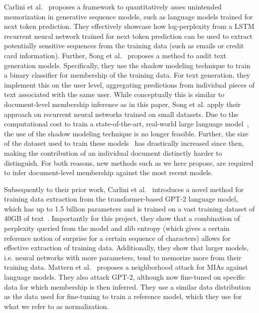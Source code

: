 \documentclass[twocolumn,10pt]{article}
\begin{document}
Carlini et al.~\cite{carlini2019secret} proposes a framework to quantitatively asses unintended memorization in generative sequence models, such as language models trained for next token prediction. They effectively showcase how log-perplexity from a LSTM recurrent neural network trained for next token prediction can be used to extract potentially sensitive sequences from the training data (such as emails or credit card information). 
Further, Song et al.~\cite{song2019auditing} proposes a method to audit text generation models. Specifically, they use the shadow modeling technique to train a binary classifier for membership of the training data. For text generation, they implement this on the user level, aggregating predictions from individual pieces of text associated with the same user. 
While conceptually this is similar to document-level membership inference as in this paper, Song et al. apply their approach on recurrent neural networks trained on small datasets. Due to the computational cost to train a state-of-the-art, real-world large language model~\cite{radford2019language,brown2020language,touvron2023llama,touvron2023llama2,jiang2023mistral}, the use of the shadow modeling technique is no longer feasible. 
Further, the size of the dataset used to train these models~\cite{bender2021dangers} has drastically increased since then, making the contribution of an individual document distinctly harder to distinguish. For both reasons, new methods such as we here propose, are required to infer document-level membership against the most recent models.

Subsequently to their prior work, Carlini et al.~\cite{carlini2021extracting} introduces a novel method for training data extraction from the transformer-based GPT-2 language model, which has up to 1.5 billion parameters and is trained on a vast training dataset of 40GB of text~\cite{radford2019language}. Importantly for this project, they show that a combination of perplexity queried from the model and zlib entropy (which gives a certain reference notion of surprise for a certain sequence of characters) allows for effective extraction of training data. Additionally, they show that larger models, i.e. neural networks with more parameters, tend to memorize more from their training data.
Mattern et al.~\cite{mattern2023membership} proposes a neighborhood attack for MIAs against language models. They also attack GPT-2, although now fine-tuned on specific data for which membership is then inferred. They use a similar data distribution as the data used for fine-tuning to train a reference model, which they use for what we refer to as normalization.
\end{document}
